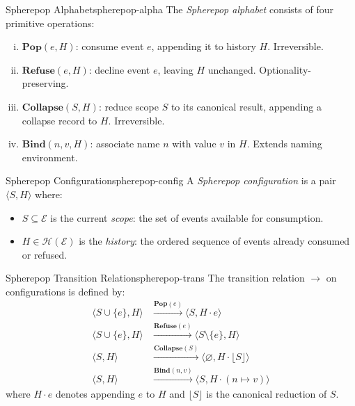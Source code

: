 \documentclass[12pt,twoside,openright]{book}
\newcommand{\hist}{\mathcal{H}}
\begin{document}
\begin{definition}{Spherepop Alphabet}{spherepop-alpha}
  The \emph{Spherepop alphabet} consists of four
  primitive operations:
  \begin{enumerate}[(i)]
    \item $\mathbf{Pop}(e, H)$: consume event $e$,
          appending it to history $H$. Irreversible.
    \item $\mathbf{Refuse}(e, H)$: decline event $e$,
          leaving $H$ unchanged. Optionality-preserving.
    \item $\mathbf{Collapse}(S, H)$: reduce scope $S$
          to its canonical result, appending a
          collapse record to $H$. Irreversible.
    \item $\mathbf{Bind}(n, v, H)$: associate name $n$
          with value $v$ in $H$. Extends naming
          environment.
  \end{enumerate}
\end{definition}

\begin{definition}{Spherepop Configuration}{spherepop-config}
  A \emph{Spherepop configuration} is a pair
  $\langle S, H \rangle$ where:
  \begin{itemize}[nosep]
    \item $S \subseteq \mathcal{E}$ is the current
          \emph{scope}: the set of events available
          for consumption.
    \item $H \in \hist(\mathcal{E})$ is the
          \emph{history}: the ordered sequence of
          events already consumed or refused.
  \end{itemize}
\end{definition}

\begin{definition}{Spherepop Transition Relation}{spherepop-trans}
  The transition relation $\to$ on configurations is
  defined by:
  \begin{align*}
    \langle S \cup \{e\}, H \rangle
    &\xrightarrow{\mathbf{Pop}(e)}
    \langle S, H \cdot e \rangle \\
    \langle S \cup \{e\}, H \rangle
    &\xrightarrow{\mathbf{Refuse}(e)}
    \langle S \setminus \{e\}, H \rangle \\
    \langle S, H \rangle
    &\xrightarrow{\mathbf{Collapse}(S)}
    \langle \varnothing, H \cdot \lfloor S \rfloor \rangle \\
    \langle S, H \rangle
    &\xrightarrow{\mathbf{Bind}(n,v)}
    \langle S, H \cdot (n \mapsto v) \rangle
  \end{align*}
  where $H \cdot e$ denotes appending $e$ to $H$ and
  $\lfloor S \rfloor$ is the canonical reduction of $S$.
\end{definition}
\end{document}
